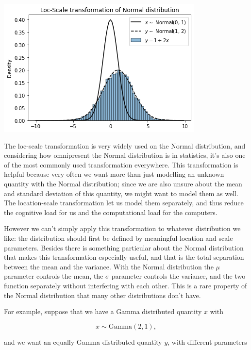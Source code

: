\documentclass[11pt]{article}
\begin{document}
\begin{center}
\includegraphics[width=.9\linewidth]{./.ob-jupyter/e92731eabdda0753d40e5c70ada87f191cb780c6.png}
\end{center}

The loc-scale transformation is very widely used on the Normal distribution, and considering how omnipresent the Normal distribution is in statistics, it's also one of the most commonly used transformation everywhere. This transformation is helpful because very often we want more than just modelling an unknown quantity with the Normal distribution; since we are also unsure about the mean and standard deviation of this quantity, we might want to model them as well. The location-scale transformation let us model them separately, and thus reduce the cognitive load for us and the computational load for the computers.

However we can't simply apply this transformation to whatever distribution we like: the distribution should first be defined by meaningful location and scale parameters. Besides there is something particular about the Normal distribution that makes this transformation especially useful, and that is the total separation between the mean and the variance. With the Normal distribution the \(\mu\) parameter controls the mean, the \(\sigma\) parameter controls the variance, and the two function separately without interfering with each other. This is a rare property of the Normal distribution that many other distributions don't have.

For example, suppose that we have a Gamma distributed quantity \(x\) with

$$x \sim \text{Gamma} (2, 1), $$

and we want an equally Gamma distributed quantity \(y\), with different parameters
\end{document}
